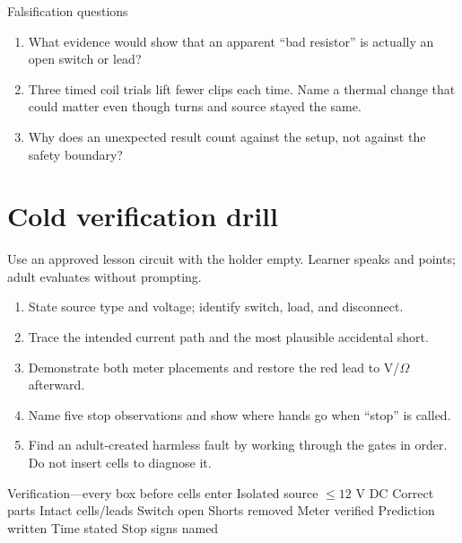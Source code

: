 \begin{telospanel}{Falsification questions}
\begin{enumerate}
\item What evidence would show that an apparent ``bad resistor'' is actually an
open switch or lead?
\item Three timed coil trials lift fewer clips each time. Name a thermal change
that could matter even though turns and source stayed the same.
\item Why does an unexpected result count against the setup, not against the
safety boundary?
\end{enumerate}
\end{telospanel}

\section{Cold verification drill}

Use an approved lesson circuit with the holder empty. Learner speaks and points;
adult evaluates without prompting.

\begin{enumerate}
\item State source type and voltage; identify switch, load, and disconnect.
\item Trace the intended current path and the most plausible accidental short.
\item Demonstrate both meter placements and restore the red lead to
V/\(\Omega\) afterward.
\item Name five stop observations and show where hands go when ``stop'' is called.
\item Find an adult-created harmless fault by working through the gates in
order. Do not insert cells to diagnose it.
\end{enumerate}

\begin{gate}{Verification---every box before cells enter}
\fbox{\rule{0pt}{.7ex}\rule{.7ex}{0pt}} Isolated source \quad
\fbox{\rule{0pt}{.7ex}\rule{.7ex}{0pt}} \(\leq 12\) V DC \quad
\fbox{\rule{0pt}{.7ex}\rule{.7ex}{0pt}} Correct parts \quad
\fbox{\rule{0pt}{.7ex}\rule{.7ex}{0pt}} Intact cells/leads \quad
\fbox{\rule{0pt}{.7ex}\rule{.7ex}{0pt}} Switch open \quad
\fbox{\rule{0pt}{.7ex}\rule{.7ex}{0pt}} Shorts removed \quad
\fbox{\rule{0pt}{.7ex}\rule{.7ex}{0pt}} Meter verified \quad
\fbox{\rule{0pt}{.7ex}\rule{.7ex}{0pt}} Prediction written \quad
\fbox{\rule{0pt}{.7ex}\rule{.7ex}{0pt}} Time stated \quad
\fbox{\rule{0pt}{.7ex}\rule{.7ex}{0pt}} Stop signs named
\end{gate}


